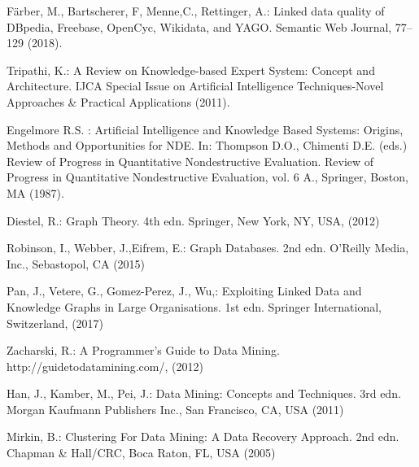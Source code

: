 \documentclass[runningheads]{llncs}
\begin{document}
\begin{thebibliography}{8}
F{\"a}rber, M., Bartscherer, F, Menne,C., Rettinger, A.: Linked data quality of DBpedia, Freebase, OpenCyc, Wikidata, and YAGO. Semantic Web Journal, 77--129 (2018). 

Tripathi, K.: A Review on Knowledge-based Expert System: Concept and Architecture. IJCA Special Issue on Artificial Intelligence Techniques-Novel Approaches \& Practical Applications (2011). 

Engelmore R.S.  : Artificial Intelligence and Knowledge Based Systems: Origins, Methods and Opportunities for NDE. In: Thompson D.O., Chimenti D.E. (eds.) Review of Progress in Quantitative Nondestructive Evaluation. Review of Progress in Quantitative Nondestructive Evaluation, vol. 6 A., 
Springer, Boston, MA (1987). 

Diestel, R.: Graph Theory. 4th edn. Springer, New York, NY, USA, (2012)

Robinson, I., Webber, J.,Eifrem, E.: Graph Databases. 2nd edn. O'Reilly Media, Inc., Sebastopol, CA (2015)

Pan, J., Vetere, G., Gomez-Perez, J., Wu,: Exploiting Linked Data and Knowledge Graphs in Large Organisations. 1st edn. Springer International, Switzerland, (2017)

Zacharski, R.: A Programmer's Guide to Data Mining. http://guidetodatamining.com/, (2012)

Han, J., Kamber, M., Pei, J.: Data Mining: Concepts and Techniques. 3rd edn. Morgan Kaufmann Publishers Inc.,
San Francisco, CA, USA (2011)

Mirkin, B.: Clustering For Data Mining: A Data Recovery Approach. 2nd edn. Chapman \& Hall/CRC,
Boca Raton, FL, USA (2005)

\end{thebibliography}

\end{document}
